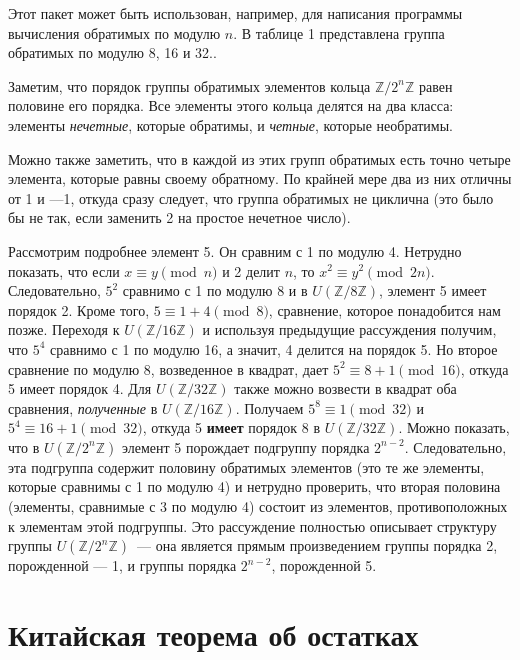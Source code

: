     Этот пакет может быть использован, например, для написания программы вычисления обратимых по модулю $n$. В таблице 1 представлена группа обратимых по модулю 8, 16 и 32..

    Заметим, что порядок группы обратимых элементов кольца $\mathbb{Z}/2^n\mathbb{Z}$ равен половине его порядка. Все элементы этого кольца делятся на два класса: элементы \textit{нечетные}, которые обратимы, и \textit{четные}, которые необратимы.

    Можно также заметить, что в каждой из этих групп обратимых есть точно четыре элемента, которые равны своему обратному. По крайней мере два из них отличны от 1 и —1, откуда сразу следует, что группа обратимых не циклична (это было бы не так, если заменить 2 на простое нечетное число).

    Рассмотрим подробнее элемент 5. Он сравним с 1 по модулю 4. Нетрудно показать, что если $x \equiv y \pmod{n}$ и 2 делит $n$, то
    $x^2 \equiv y^2 \pmod{2n}$. Следовательно, $5^2$ сравнимо с 1 по модулю 8 и в $U(\mathbb{Z}/8\mathbb{Z})$, элемент 5 имеет порядок 2. Кроме того, $5 \equiv 1 + 4 \pmod{8}$, сравнение, которое понадобится нам позже. Переходя к $U(\mathbb{Z}/16\mathbb{Z})$ и используя предыдущие рассуждения получим, что $5^4$ сравнимо с 1 по модулю 16, а значит, 4 делится на порядок 5. Но второе сравнение по модулю 8, возведенное в квадрат, дает $5^2 \equiv 8 + 1 \pmod{16}$, откуда 5 имеет порядок 4. Для $U(\mathbb{Z}/32\mathbb{Z})$ также можно возвести в квадрат оба сравнения, \textit{полученные} в $U(\mathbb{Z}/16\mathbb{Z})$. Получаем $5^8 \equiv 1 \pmod{32}$ и $5^4 \equiv 16 + 1 \pmod{32}$, откуда 5 {\textbf{имеет}} порядок 8 в $U(\mathbb{Z}/32\mathbb{Z})$. Можно показать, что в $U(\mathbb{Z}/2^n\mathbb{Z})$ элемент 5 порождает подгруппу порядка $2^{n-2}$. Следовательно, эта подгруппа содержит половину обратимых элементов (это те же элементы, которые сравнимы с 1 по модулю 4) и нетрудно проверить, что вторая половина (элементы, сравнимые с 3 по модулю 4) состоит из элементов, противоположных к элементам этой подгруппы. Это рассуждение полностью описывает структуру группы $U(\mathbb{Z}/2^n\mathbb{Z})$~— она является прямым произведением группы порядка 2, порожденной — 1, и группы порядка $2^{n-2}$, порожденной 5.

    \section{Китайская теорема об остатках}

